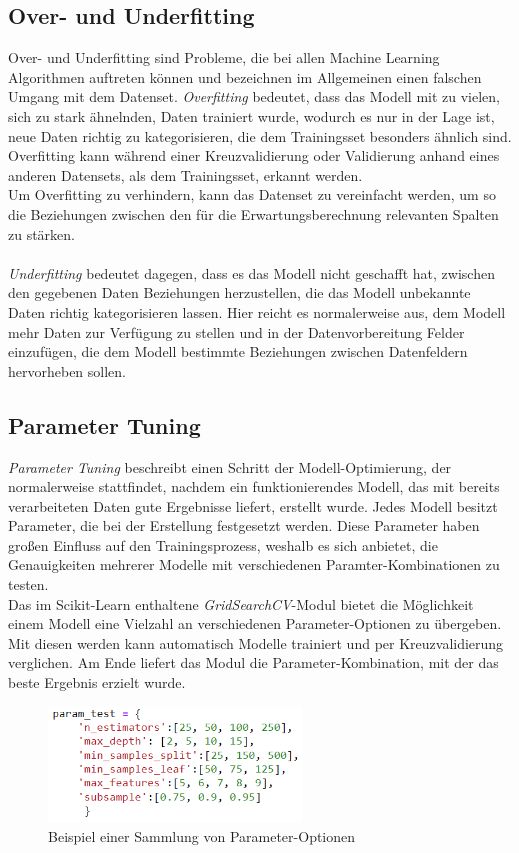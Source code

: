 \subsection{Over- und Underfitting}
Over- und Underfitting sind Probleme, die bei allen Machine Learning Algorithmen auftreten können und bezeichnen 
im Allgemeinen einen falschen Umgang mit dem Datenset.
\textit{Overfitting} bedeutet, dass das Modell mit zu vielen, sich zu stark ähnelnden, Daten trainiert wurde, 
wodurch es nur in der Lage ist, neue Daten richtig zu kategorisieren, die dem Trainingsset besonders ähnlich sind.
Overfitting kann während einer Kreuzvalidierung oder Validierung anhand eines anderen Datensets, als dem 
Trainingsset, erkannt werden.\\
Um Overfitting zu verhindern, kann das Datenset zu vereinfacht werden, um so die Beziehungen zwischen den
für die Erwartungsberechnung relevanten Spalten zu stärken.\\\\
\textit{Underfitting} bedeutet dagegen, dass es das Modell nicht geschafft hat, zwischen den gegebenen Daten
Beziehungen herzustellen, die das Modell unbekannte Daten richtig kategorisieren lassen. Hier reicht es 
normalerweise aus, dem Modell mehr Daten zur Verfügung zu stellen und in der Datenvorbereitung Felder 
einzufügen, die dem Modell bestimmte Beziehungen zwischen Datenfeldern hervorheben sollen. 

\subsection{Parameter Tuning}
\textit{Parameter Tuning} beschreibt einen Schritt der Modell-Optimierung, der normalerweise stattfindet, 
nachdem ein funktionierendes Modell, das mit bereits verarbeiteten Daten gute Ergebnisse liefert, erstellt 
wurde. Jedes Modell besitzt Parameter, die bei der Erstellung festgesetzt werden. Diese Parameter haben 
großen Einfluss auf den Trainingsprozess, weshalb es sich anbietet, die Genauigkeiten mehrerer Modelle 
mit verschiedenen Paramter-Kombinationen zu testen.\\
Das im Scikit-Learn enthaltene \textit{GridSearchCV}-Modul
bietet die Möglichkeit einem Modell eine Vielzahl an verschiedenen Parameter-Optionen zu übergeben. Mit diesen 
werden kann automatisch Modelle trainiert und per Kreuzvalidierung verglichen. Am Ende liefert das Modul 
die Parameter-Kombination, mit der das beste Ergebnis erzielt wurde.

\begin{figure}[h]
    \centering
    \includegraphics[width=0.6\textwidth]{pic/param_test.png}
    \caption{Beispiel einer Sammlung von Parameter-Optionen}
    \label{fig:CV}
\end{figure}

